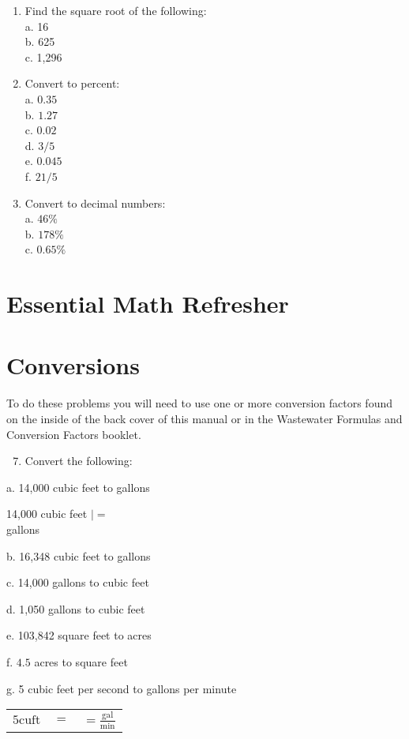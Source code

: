 \begin{enumerate}
\begin{enumerate}
  \item Find the square root of the following:\\
a. 16\\
b. 625\\
c. 1,296

  \item Convert to percent:\\
a. $0.35$\\
b. $1.27$\\
c. $0.02$\\
d. $3 / 5$\\
e. $0.045$\\
f. $21 / 5$

  \item Convert to decimal numbers:\\
a. $46 \%$\\
b. $178 \%$\\
c. $0.65 \%$

\end{enumerate}
\section{Essential Math Refresher}
\section{Conversions}
To do these problems you will need to use one or more conversion factors found on the inside of the back cover of this manual or in the Wastewater Formulas and Conversion Factors booklet.

\begin{enumerate}
  \setcounter{enumi}{6}
  \item Convert the following:
\end{enumerate}
a. 14,000 cubic feet to gallons

14,000 cubic feet $\mid=$\\
gallons

b. 16,348 cubic feet to gallons

c. 14,000 gallons to cubic feet

d. 1,050 gallons to cubic feet

e. 103,842 square feet to acres

f. $4.5$ acres to square feet

g. 5 cubic feet per second to gallons per minute

\begin{tabular}{l|l|l}
$5 \mathrm{cuft}$ & $=$ & $=\frac{\mathrm{gal}}{\mathrm{min}}$ \\
\end{tabular}


\end{enumerate}

